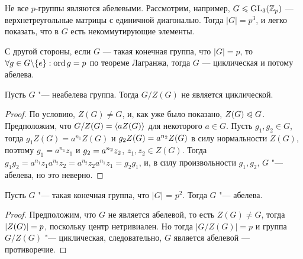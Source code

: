 \begin{example}
	Не все $p$-группы являются абелевыми. Рассмотрим, например, $G \leqslant \operatorname{GL}_3(\mathbb{Z}_p)$ --- верхнетреугольные матрицы с единичной диагональю. Тогда $|G| = p^3$, и легко показать, что в $G$ есть некоммутирующие элементы.
	
	С другой стороны, если $G$ --- такая конечная группа, что $|G| = p$, то $\forall g \in G \bs \{e\}: \ord{g} \hm= p$ по теореме Лагранжа, тогда $G$ --- циклическая и потому абелева.
\end{example}

\begin{theorem}
	Пусть $G$ "--- неабелева группа. Тогда $G / Z(G)$ не является циклической.
\end{theorem}

\begin{proof}
	По условию, $Z(G) \ne G$, и, как уже было показано, $Z(G) \trianglelefteqslant G$. Предположим, что $G / Z(G) = \langle aZ(G)\rangle$ для некоторого $a \in G$. Пусть $g_1, g_2 \in G$, тогда $g_1Z(G) = a^{n_1}Z(G)$ и $g_2Z(G) \hm= a^{n_2}Z(G)$ в силу нормальности $Z(G)$, поэтому $g_1 = a^{n_1}z_1$ и $g_2 \hm= a^{n_2}z_2$, $z_1, z_2 \in Z(G)$. Тогда $g_1g_2 = a^{n_1}z_1a^{n_2}z_2 = a^{n_2}z_2a^{n_1}z_1 = g_2g_1$, и, в силу произвольности $g_1, g_2$, $G$ "--- абелева, но это неверно.
\end{proof}

\begin{corollary}
	Пусть $G$ "--- такая конечная группа, что $|G|$ = $p^2$. Тогда $G$ "--- абелева.
\end{corollary}

\begin{proof}
	Предположим, что $G$ не является абелевой, то есть $Z(G) \ne G$, тогда $|Z(G)| \hm= p$, поскольку центр нетривиален. Но тогда $|G / Z(G)| = p$ и группа $G / Z(G)$ "--- циклическая, следовательно, $G$ является абелевой --- противоречие.
\end{proof}
